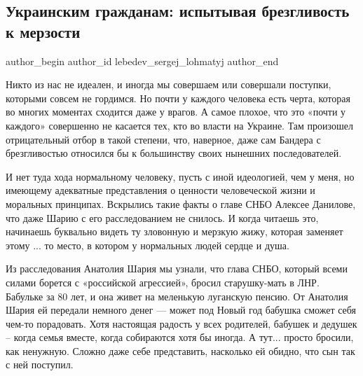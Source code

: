  
 
 
 
 
\subsection{Украинским гражданам: испытывая брезгливость к мерзости}
\label{sec:02_12_2021.stz.news.nvr.voshod_info.1.danilov_brezglivost_merzost}


\ifcmt
 author_begin
   author_id lebedev_sergej_lohmatyj
 author_end
\fi


Никто из нас не идеален, и иногда мы совершаем или совершали поступки, которыми
совсем не гордимся. Но почти у каждого человека есть черта, которая во многих
моментах сходится даже у врагов. А самое плохое, что это «почти у каждого»
совершенно не касается тех, кто во власти на Украине. Там произошел
отрицательный отбор в такой степени, что, наверное, даже сам Бандера с
брезгливостью относился бы к большинству своих нынешних последователей.

И нет туда хода нормальному человеку, пусть с иной идеологией, чем у меня, но
имеющему адекватные представления о ценности человеческой жизни и моральных
принципах. Вскрылись такие факты о главе СНБО Алексее Данилове, что даже Шарию
с его расследованием не снилось. И когда читаешь это, начинаешь буквально
видеть ту зловонную и мерзкую жижу, которая заменяет этому ... то место, в
котором у нормальных людей сердце и душа.

Из расследования Анатолия Шария мы узнали, что глава СНБО, который всеми силами
борется с «российской агрессией», бросил старушку-мать в ЛНР. Бабульке за 80
лет, и она живет на меленькую луганскую пенсию. От Анатолия Шария ей передали
немного денег — может под Новый год бабушка сможет себя чем-то порадовать. Хотя
настоящая радость у всех родителей, бабушек и дедушек – когда семья вместе,
когда собираются хотя бы иногда. А тут... просто бросили, как ненужную. Сложно
даже себе представить, насколько ей обидно, что сын так с ней поступил.


